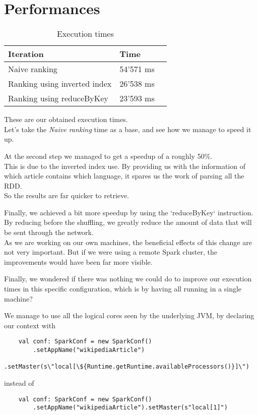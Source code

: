 \documentclass[a4paper]{article}
\begin{document}
	\pagebreak

	\section{Performances}
	
	\begin{table}[H]
		\centering

		\begin{tabular}{|l|l|l|}
			\hline
			\textbf{Iteration}           & \textbf{Time} \\ \hline
			Naive ranking                & 54'571 ms     \\ \hline
			Ranking using inverted index & 26'538 ms     \\ \hline
			Ranking using reduceByKey    & 23'593 ms     \\ \hline
		\end{tabular}
		\caption{Execution times}
	\end{table}
	
	These are our obtained execution times. \\
	Let's take the \textit{Naive ranking} time as a base, and see how we manage to speed it up.
	
	At the second step we managed to get a speedup of a roughly 50\%.  \\
	This is due to the inverted index use. By providing us with the information of which article contains which language, it spares us the work of parsing all the RDD. \\
    So the results are far quicker to retrieve.
	
	Finally, we achieved a bit more speedup by using the `reduceByKey` instruction. \\
	By reducing before the shuffling, we greatly reduce the amount of data that will be sent through the network. \\
	As we are working on our own machines, the beneficial effects of this change are not very important.
	But if we were using a remote Spark cluster, the improvements would have been far more visible.
	
	Finally, we wondered if there was nothing we could do to improve our execution times in this specific configuration, which is by having all running in a single machine?
	
	We manage to use all the logical cores seen by the underlying JVM, by declaring our context with  
	\begin{verbatim}
	val conf: SparkConf = new SparkConf()
	    .setAppName("wikipediaArticle") 
	    .setMaster(s\"local[\${Runtime.getRuntime.availableProcessors()}]\")
    \end{verbatim}	
	instead of  
	\begin{verbatim}
	val conf: SparkConf = new SparkConf()
	    .setAppName("wikipediaArticle").setMaster(s"local[1]")
	\end{verbatim}
	
\end{document}
